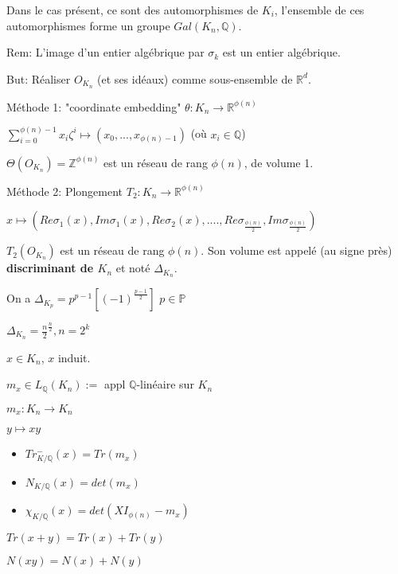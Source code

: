 Dans le cas présent, ce sont des automorphismes de $K_i$, l'ensemble de ces automorphismes forme un groupe $Gal(K_n,\mathbb{Q})$.

Rem: L'image d'un entier algébrique par $\sigma_k$ est un entier algébrique.

But: Réaliser $O_{K_n}$ (et ses idéaux) comme sous-ensemble de $\mathbb{R}^d$.

Méthode 1: "coordinate embedding"
$\theta: K_n \rightarrow \mathbb{R}^{\phi(n)}$

$\sum_{i=0}^{\phi(n)-1} x_i \zeta^i \mapsto (x_0,...,x_{\phi(n)-1})$ (où $x_i \in \mathbb{Q}$)

\begin{proposition}
$\Theta(O_{K_n})=\mathbb{Z}^{\phi(n)}$ est un réseau de rang $\phi(n)$, de volume 1.
\end{proposition}
Méthode 2: Plongement $T_2: K_n \rightarrow \mathbb{R}^{\phi(n)}$

$x \mapsto (Re \sigma_1(x), Im \sigma_1(x),Re \sigma_2(x),...., Re \sigma_{\frac{\phi(n)}{2}}, Im \sigma_{\frac{\phi(n)}{2}})$

\begin{proposition}
$T_2(O_{K_n})$ est un réseau de rang $\phi(n)$. Son volume est appelé (au signe près) \textbf{discriminant de $K_n$} et noté $\Delta_{K_n}$.
\end{proposition}

On a $\Delta_{K_p}=p^{p-1}[(-1)^{\frac{p-1}{2}}]$ $p \in \mathbb{P}$

$\Delta_{K_n}=\frac{n}{2}^{\frac{n}{2}}, n=2^k$

\begin{definition}
$x \in K_n$, $x$ induit.

$m_x \in L_{\mathbb{Q}}(K_n):=$ appl $\mathbb{Q}$-linéaire sur $K_n$

$m_x : K_n \rightarrow K_n$

$y \mapsto xy$
\begin{itemize}
\item $Tr_{K/\mathbb{Q}}^-(x)=Tr(m_x)$
\item $N_{K/\mathbb{Q}}(x)=det(m_x)$
\item $\chi_{K/\mathbb{Q}}(x)=det(X I_{\phi(n)}-m_x)$
\end{itemize}
\end{definition}

\begin{proposition}
$Tr(x+y)=Tr(x)+Tr(y)$

$N(xy)=N(x)+N(y)$
\end{proposition}


